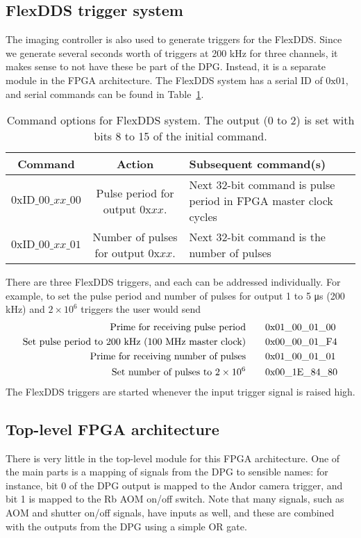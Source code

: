 \documentclass[]{article}
\begin{document}
\subsection{FlexDDS trigger system}
\label{ssec:flexdds}
The imaging controller is also used to generate triggers for the FlexDDS.  Since we generate several seconds worth of triggers at 200 kHz for three channels, it makes sense to not have these be part of the DPG.  Instead, it is a separate module in the FPGA architecture.  The FlexDDS system has a serial ID of $0\mathrm{x}01$, and serial commands can be found in Table~\ref{tb:flexdds}.
\begin{table}[htbp]
	\centering
	\begin{tabular}{c|c|p{5cm}}
		Command							&	Action													&	Subsequent command(s)\\\hline
		$0\mathrm{xID}\_00\_xx\_00$		&	Pulse period for output $0\mathrm{x}xx$.				&	Next 32-bit command is pulse period in FPGA master clock cycles\\\hline
		$0\mathrm{xID}\_00\_xx\_01$		&	Number of pulses for output $0\mathrm{x}xx$.			&	Next 32-bit command is the number of pulses\\\hline
	\end{tabular}
	\caption{Command options for FlexDDS system.  The output (0 to 2) is set with bits 8 to 15 of the initial command.}
	\label{tb:flexdds}
\end{table}
There are three FlexDDS triggers, and each can be addressed individually.  For example, to set the pulse period and number of pulses for output 1 to 5 \si{\micro\second} (200 kHz) and $2\times 10^6$ triggers the user would send
\begin{align}
\textrm{Prime for receiving pulse period}\quad\quad&0\mathrm{x}01\_00\_01\_00\notag\\
\textrm{Set pulse period to 200 kHz (100 MHz master clock)}\quad\quad&0\mathrm{x}00\_00\_01\_\mathrm{F}4\notag\\
\textrm{Prime for receiving number of pulses}\quad\quad&0\mathrm{x}01\_00\_01\_01\notag\\
\textrm{Set number of pulses to }2\times10^6\quad\quad&0\mathrm{x}00\_1\mathrm{E}\_84\_80\notag
\end{align}
The FlexDDS triggers are started whenever the input trigger signal is raised high.

\subsection{Top-level FPGA architecture}
\label{ssec:top-fpga}
There is very little in the top-level module for this FPGA architecture.  One of the main parts is a mapping of signals from the DPG to sensible names: for instance, bit 0 of the DPG output is mapped to the Andor camera trigger, and bit 1 is mapped to the Rb AOM on/off switch.  Note that many signals, such as AOM and shutter on/off signals, have inputs as well, and these are combined with the outputs from the DPG using a simple OR gate.
\end{document}
